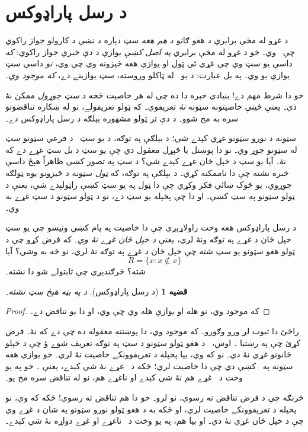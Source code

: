 \documentclass[12pt,a4paper,oneside]{report}
\newcommand{\Setabs}[2]{\{#1 : #2\}}
\newcommand{\olfileid}[3]{\gdef\pspart{#1}\gdef\pschapter{#2}\gdef\pssection{#3}}
\newcommand{\olsection}[1]{\section{#1}\label{\pspart:\pschapter:\pssection:sec}}
\newcommand{\ollabel}[1]{\label{\pspart:\pschapter:\pssection:#1}}
\newenvironment{explain}{}{}
\newenvironment{tagblock}[1]{}{}
\newtheorem{thm}[defn]{قضيه}
\begin{document}
\olfileid{sfr}{set}{rus}
\olsection{د رسل پاراډوکس}

د غړو له مخې برابري د هغو  ګانو د \emph{هم هغه} سټ دپاره د \LR{$\Setabs{x}{\phi(x)}$} نښې د کارولو جواز راکوي چې~ وي۔ خو د غړو له مخې برابري \emph{په اصل کښې} يوازې د دې خبرې جواز راکوي: \emph{که} داسې يو سټ وي چې غړي ئې ټول او يوازې هغه څيزونه وي چې \LR{$\phi$} وي، \emph{نو} داسې سټ يوازې يو وي۔ په بل عبارت: د يو~\LR{$\phi$} له ټاکلو وروسته، سټ \LR{$\Setabs{x}{\phi(x)}$} يوازينے دے، \emph{که موجود وي}۔

خو دا شرط مهم دے!{} بنيادي خبره دا ده چې له هر خاصيت څخه د \emph{سټ جوړول} ممکن نۀ دي۔ يعنې ځينې خاصيتونه سټونه \emph{نۀ} تعريفوي۔ که ټولو تعريفولے، نو له ښکاره تناقضونو سره به مخ شوو۔ د دې تر ټولو مشهوره بېلګه د رسل پاراډوکس دے۔

سټونه د نورو سټونو غړي کېدے شي؛ د بېلګې په توګه، د يو سټ~ د فرعي سټونو سټ له سټونو جوړ وي۔ نو دا پوښتل يا څېړل معقول دي چې يو سټ د بل سټ غړے دے که نۀ۔ آيا يو سټ د خپل ځان غړے کېدے شي؟ د سټ په تصور کښې ظاهراً هېڅ داسې خبره نشته چې دا ناممکنه کړي۔ د بېلګې په توګه، که \emph{ټول} سټونه د څيزونو يوه ټولګه جوړوي، يو څوک ښائي فکر وکړي چې دا ټول په يو سټ کښې راټولېدے شي، يعنې د ټولو سټونو په سټ کښې۔ او دا چې پخپله يو سټ دے، نو د ټولو سټونو د سټ غړے به وي۔

د رسل پاراډوکس هغه وخت راولاړېږي چې دا خاصيت په پام کښې ونيسو چې يو سټ خپل ځان د غړے په توګه ونۀ لري، يعنې \emph{د خپل ځان غړے نۀ وي}۔ که فرض کړو چې د ټولو هغو سټونو يو سټ شته چې خپل ځان د غړے په توګه نۀ لري، نو څه به وشي؟ آيا
\[
R = \Setabs{x}{x \notin x}
\]
شته؟ څرګندېږي چې ثابتولے شو دا نشته۔

\begin{thm}[د رسل پاراډوکس]\ollabel{thm:russells-paradox}
	د \LR{$R = \Setabs{x}{x \notin x}$} په بڼه هېڅ سټ نشته۔
\end{thm}

\begin{proof}
که \LR{$R = \Setabs{x}{x \notin x}$} موجود وي، نو  هله او يوازې هله وي چې  وي، او دا يو تناقض دے۔
\end{proof}

\begin{tagblock}{novice}
\begin{explain}
راځئ دا ثبوت لږ ورو وګورو۔ که  موجود وي، دا پوښتنه معقوله ده چې  دے که نۀ۔ فرض کړئ چې په رښتيا ۔ اوس، ~د هغو ټولو سټونو د سټ په توګه تعريف شوے ؤ چې د خپلو ځانونو غړي نۀ دي۔ نو که  وي، بيا  پخپله د  تعريفوونکے خاصيت نۀ لري۔ خو يوازې هغه سټونه په~ کښې دي چې دا خاصيت لري؛ ځکه  د~ غړے نۀ شي کېدے، يعنې ۔ خو  په يو وخت د~ غړے هم نۀ شي کېدے او ناغړے هم، نو له تناقض سره مخ يو۔

څرنګه چې د  فرض تناقض ته رسوي، نو  لرو۔ خو دا هم تناقض ته رسوي!{} ځکه که  وي، نو  پخپله د  تعريفوونکے خاصيت لري، او ځکه  به د هغو ټولو نورو سټونو په شان د  غړے وي چې د خپل ځان غړي نۀ دي۔ او بيا هم، په يو وخت د~ ناغړے او غړے دواړه نۀ شي کېدے۔
\end{explain}
\end{tagblock}
\end{document}
